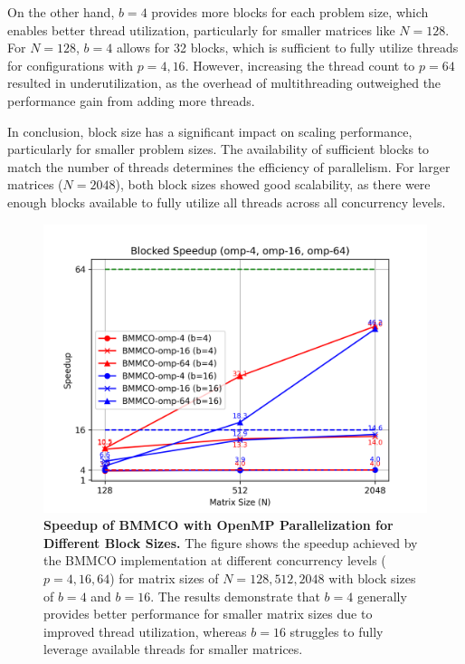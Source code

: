 On the other hand, \(b = 4\) provides more blocks for each problem size, which enables better thread utilization, particularly for smaller matrices like \(N = 128\). For \(N = 128\), \(b = 4\) allows for 32 blocks, which is sufficient to fully utilize threads for configurations with \(p = 4, 16\). However, increasing the thread count to \(p = 64\) resulted in underutilization, as the overhead of multithreading outweighed the performance gain from adding more threads. 

In conclusion, block size has a significant impact on scaling performance, particularly for smaller problem sizes. The availability of sufficient blocks to match the number of threads determines the efficiency of parallelism. For larger matrices (\(N = 2048\)), both block sizes showed good scalability, as there were enough blocks available to fully utilize all threads across all concurrency levels.

\begin{figure}[htbp]
    \centering
    \includegraphics[width=1.0\linewidth]{images/Blocked_Speedup.png}
    \caption{\textbf{Speedup of BMMCO with OpenMP Parallelization for Different Block Sizes.} The figure shows the speedup achieved by the BMMCO implementation at different concurrency levels (\(p = 4, 16, 64\)) for matrix sizes of \(N = 128, 512, 2048\) with block sizes of \(b = 4\) and \(b = 16\). The results demonstrate that \(b = 4\) generally provides better performance for smaller matrix sizes due to improved thread utilization, whereas \(b = 16\) struggles to fully leverage available threads for smaller matrices.}
    \label{fig:blocked-speedup}
\end{figure}


